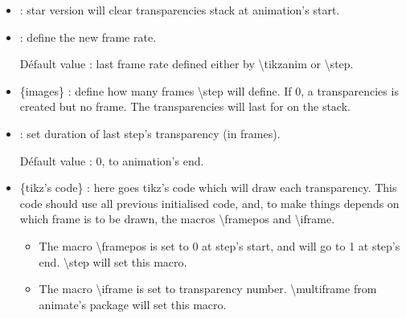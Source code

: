 \documentclass[a4paper,12pt]{article}
\newcommand\Tikz{{\ttfamily tikz}}
\newcommand\Animate{{\ttfamily animate}}
\begin{document}
	\begin{itemize}
		\item {\ttfamily *} : star version will clear transparencies stack at animation's start.
		\item {} : define the new frame rate.
		
		Défault value : last frame rate defined either by {\ttfamily\textbackslash tikzanim} or {\ttfamily\textbackslash step}.
		\item {\ttfamily\{images\}} : define how many frames {\ttfamily\textbackslash step} will define. If 0, a transparencies is created but no frame. The transparencies will last for {\ttfamily[duration]} on the stack.
		
		\item {\ttfamily[duration]} : set duration of last step's transparency (in frames).
		
		Défault value : 0, to animation's end.
		
		\item {\ttfamily\{tikz's code\}} : here goes \Tikz's code which will draw each transparency. This code should use all previous initialised code,
		and, to make things depends on which frame is to be drawn, the macros {\ttfamily\textbackslash framepos} and {\ttfamily\textbackslash iframe}.
		
		\begin{itemize}
			\item The macro {\ttfamily\textbackslash framepos} is set to 0 at step's start, and will go to 1 at step's end. {\ttfamily\textbackslash step} will set this macro.
			\item The macro {\ttfamily\textbackslash iframe} is set to transparency number. {\ttfamily\textbackslash multiframe} from \Animate's package will set this macro.
		\end{itemize}
		
	\end{itemize}
	
\end{document}
